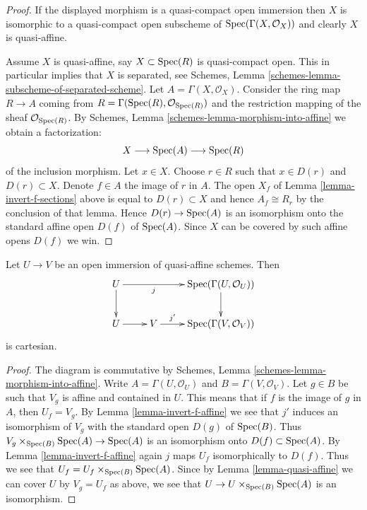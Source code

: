 \begin{proof}
If the displayed morphism is a quasi-compact open immersion then
$X$ is isomorphic to a quasi-compact open subscheme of
$\mathop{\mathrm{Spec}}(\Gamma(X, \mathcal{O}_X))$ and clearly $X$ is quasi-affine.

\medskip\noindent
Assume $X$ is quasi-affine, say $X \subset \mathop{\mathrm{Spec}}(R)$ is
quasi-compact open. This in particular implies that $X$ is
separated, see
Schemes, Lemma \ref{schemes-lemma-subscheme-of-separated-scheme}.
Let $A = \Gamma(X, \mathcal{O}_X)$.
Consider the ring map $R \to A$ coming from
$R = \Gamma(\mathop{\mathrm{Spec}}(R), \mathcal{O}_{\mathop{\mathrm{Spec}}(R)})$
and the restriction mapping of the sheaf $\mathcal{O}_{\mathop{\mathrm{Spec}}(R)}$.
By Schemes, Lemma \ref{schemes-lemma-morphism-into-affine}
we obtain a factorization:
$$
X \longrightarrow
\mathop{\mathrm{Spec}}(A) \longrightarrow
\mathop{\mathrm{Spec}}(R)
$$
of the inclusion morphism. Let $x \in X$. Choose $r \in R$ such that
$x \in D(r)$ and $D(r) \subset X$. Denote $f \in A$ the image of $r$
in $A$. The open $X_f$ of Lemma \ref{lemma-invert-f-sections}
above is equal to $D(r) \subset X$ and hence $A_f \cong R_r$ by the
conclusion of that lemma.
Hence $D(r) \to \mathop{\mathrm{Spec}}(A)$ is an isomorphism onto the
standard affine open $D(f)$ of $\mathop{\mathrm{Spec}}(A)$. Since $X$
can be covered by such affine opens $D(f)$ we win.
\end{proof}

\begin{lemma}
\label{lemma-cartesian-diagram-quasi-affine}
Let $U \to V$ be an open immersion of quasi-affine schemes. Then
$$
\xymatrix{
U \ar[d] \ar[rr]_-j & & \Spec(\Gamma(U, \mathcal{O}_U)) \ar[d] \\
U \ar[r] & V \ar[r]^-{j'} & \Spec(\Gamma(V, \mathcal{O}_V))
}
$$
is cartesian.
\end{lemma}

\begin{proof}
The diagram is commutative by Schemes, Lemma
\ref{schemes-lemma-morphism-into-affine}.
Write $A = \Gamma(U, \mathcal{O}_U)$ and $B = \Gamma(V, \mathcal{O}_V)$. Let
$g \in B$ be such that $V_g$ is affine and contained in $U$. This
means that if $f$ is the image of $g$ in $A$, then $U_f = V_g$. By Lemma
\ref{lemma-invert-f-affine} we see that $j'$ induces an isomorphism of
$V_g$ with the standard open $D(g)$ of $\mathop{\mathrm{Spec}}(B)$. Thus
$V_g \times_{\mathop{\mathrm{Spec}}(B)} \mathop{\mathrm{Spec}}(A) \to \mathop{\mathrm{Spec}}(A)$ is an
isomorphism onto $D(f) \subset \mathop{\mathrm{Spec}}(A)$. By Lemma \ref{lemma-invert-f-affine}
again $j$ maps $U_f$ isomorphically to $D(f)$. Thus we see that
$U_f = U_f \times_{\mathop{\mathrm{Spec}}(B)} \mathop{\mathrm{Spec}}(A)$. Since by
Lemma \ref{lemma-quasi-affine} we can cover $U$ by $V_g = U_f$ as above,
we see that $U \to U \times_{\mathop{\mathrm{Spec}}(B)} \mathop{\mathrm{Spec}}(A)$ is an isomorphism.
\end{proof}


